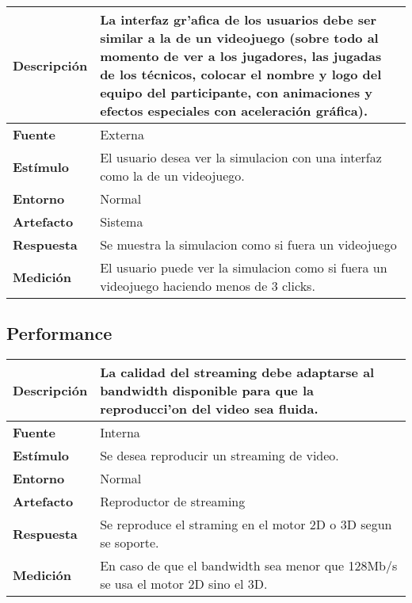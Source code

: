 \begin{center}
  \begin{tabular}{| l | p{10cm} | }
    \hline
  \textbf{Descripción} & La interfaz gr'afica de los usuarios debe ser similar a la de un videojuego (sobre todo al momento de ver a los jugadores, las jugadas de los técnicos, colocar el nombre y logo del equipo del participante, con animaciones y efectos especiales con aceleración gráfica). \\  \hline
  \textbf{Fuente} & Externa\\  \hline
  \textbf{Estímulo} & El usuario desea ver la simulacion con una interfaz como la de un videojuego.\\  \hline
  \textbf{Entorno} & Normal\\  \hline
  \textbf{Artefacto} & Sistema\\  \hline
  \textbf{Respuesta} & Se muestra la simulacion como si fuera un videojuego\\  \hline
  \textbf{Medición} & El usuario puede ver la simulacion como si fuera un videojuego haciendo menos de 3 clicks.\\  \hline
  \end{tabular}
\end{center} 



\subsection{Performance}
\begin{center}
  \begin{tabular}{| l | p{10cm} | }
    \hline
  \textbf{Descripción} & La calidad del streaming debe adaptarse al bandwidth disponible para que la reproducci'on del video sea fluida.\\  \hline
  \textbf{Fuente} & Interna\\  \hline
  \textbf{Estímulo} & Se desea reproducir un streaming de video.\\  \hline
  \textbf{Entorno} & Normal\\  \hline
  \textbf{Artefacto} & Reproductor de streaming\\  \hline
  \textbf{Respuesta} & Se reproduce el straming en el motor 2D o 3D segun se soporte.\\  \hline
  \textbf{Medición} & En caso de que el bandwidth sea menor que 128Mb/s se usa el motor 2D sino el 3D.\\  \hline
  \end{tabular}
\end{center} 


